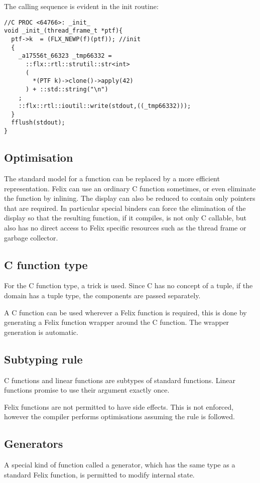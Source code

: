 \documentclass[oneside]{book}
\begin{document}
The calling sequence is evident in the init routine:
\begin{verbatim}
//C PROC <64766>: _init_
void _init_(thread_frame_t *ptf){
  ptf->k  = (FLX_NEWP(f)(ptf)); //init
  {
    _a17556t_66323 _tmp66332 = 
      ::flx::rtl::strutil::str<int>
      (
        *(PTF k)->clone()->apply(42)
      ) + ::std::string("\n") 
    ;
    ::flx::rtl::ioutil::write(stdout,((_tmp66332)));
  }
  fflush(stdout);
}
\end{verbatim}

\subsection{Optimisation}
The standard model for a function can be replaced by a more efficient representation.
Felix can use an ordinary C function sometimes, or even eliminate the function
by inlining. The display can also be reduced to contain only pointers that are
required. In particular special binders can force the elimination of the display
so that the resulting function, if it compiles, is not only C callable, but also
has no direct access to Felix specific resources such as the thread frame or
garbage collector.

\subsection{C function type}
For the C function type, a trick is used. Since C has no concept of a tuple,
if the domain has a tuple type, the components are passed separately.

A C function can be used wherever a Felix function is required, this is done
by generating a Felix function wrapper around the C function. The wrapper
generation is automatic.

\subsection{Subtyping rule}
C functions and linear functions are subtypes of standard functions.
Linear functions promise to use their argument exactly once.

Felix functions are not permitted to have side effects. This is not
enforced, however the compiler performs optimisations assuming the rule
is followed.

\subsection{Generators}
A special kind of function called a generator, which has the same type
as a standard Felix function, is permitted to modify internal state.
\end{document}
